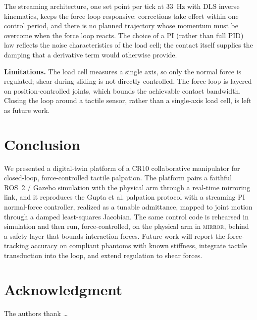 \documentclass[conference]{IEEEtran}
\begin{document}
The streaming architecture, one set point per tick at \SI{33}{\hertz} with DLS
inverse kinematics, keeps the force loop responsive: corrections take effect
within one control period, and there is no planned trajectory whose momentum must
be overcome when the force loop reacts. The choice of a PI (rather than full PID)
law reflects the noise characteristics of the load cell; the contact itself
supplies the damping that a derivative term would otherwise provide.

\textbf{Limitations.} The load cell measures a single axis, so only the normal
force is regulated; shear during sliding is not directly controlled. The force
loop is layered on position-controlled joints, which bounds the achievable
contact bandwidth. Closing the loop around a tactile sensor, rather than a
single-axis load cell, is left as future work.

\section{Conclusion}
We presented a digital-twin platform of a CR10 collaborative manipulator for
closed-loop, force-controlled tactile palpation. The platform pairs a faithful
ROS~2 / Gazebo simulation with the physical arm through a real-time mirroring
link, and it reproduces the Gupta et al. palpation protocol with a streaming PI
normal-force controller, realized as a tunable admittance, mapped to joint
motion through a damped least-squares Jacobian. The same control code is rehearsed
in simulation and then run, force-controlled, on the physical arm in
\textsc{mirror}, behind a safety layer that bounds interaction forces. Future work
will report the force-tracking accuracy on compliant phantoms with known
stiffness, integrate tactile transduction into the loop, and extend regulation to
shear forces.

\section*{Acknowledgment}
The authors thank \dots
\end{document}
